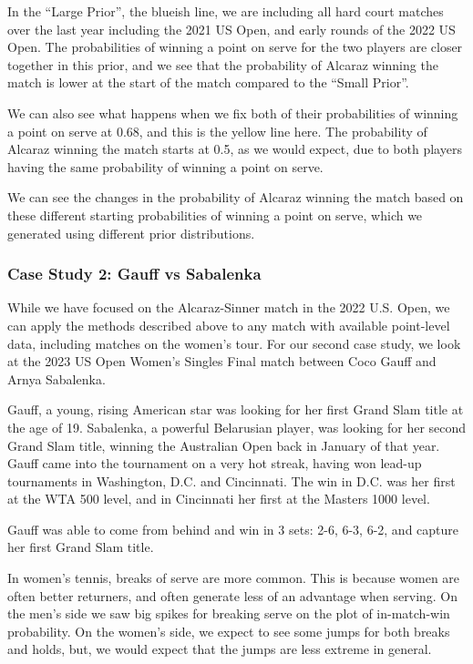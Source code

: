 \documentclass[
  letterpaper,
  DIV=11,
  numbers=noendperiod]{scrartcl}
\begin{document}
In the ``Large Prior'', the blueish line, we are including all hard
court matches over the last year including the 2021 US Open, and early
rounds of the 2022 US Open. The probabilities of winning a point on
serve for the two players are closer together in this prior, and we see
that the probability of Alcaraz winning the match is lower at the start
of the match compared to the ``Small Prior''.

We can also see what happens when we fix both of their probabilities of
winning a point on serve at 0.68, and this is the yellow line here. The
probability of Alcaraz winning the match starts at 0.5, as we would
expect, due to both players having the same probability of winning a
point on serve.

We can see the changes in the probability of Alcaraz winning the match
based on these different starting probabilities of winning a point on
serve, which we generated using different prior distributions.

\subsubsection{Case Study 2: Gauff vs Sabalenka}\label{sec-gauffsab}

While we have focused on the Alcaraz-Sinner match in the 2022 U.S. Open,
we can apply the methods described above to any match with available
point-level data, including matches on the women's tour. For our second
case study, we look at the 2023 US Open Women's Singles Final match
between Coco Gauff and Arnya Sabalenka.

Gauff, a young, rising American star was looking for her first Grand
Slam title at the age of 19. Sabalenka, a powerful Belarusian player,
was looking for her second Grand Slam title, winning the Australian Open
back in January of that year. Gauff came into the tournament on a very
hot streak, having won lead-up tournaments in Washington, D.C. and
Cincinnati. The win in D.C. was her first at the WTA 500 level, and in
Cincinnati her first at the Masters 1000 level.

Gauff was able to come from behind and win in 3 sets: 2-6, 6-3, 6-2, and
capture her first Grand Slam title.

In women's tennis, breaks of serve are more common. This is because
women are often better returners, and often generate less of an
advantage when serving. On the men's side we saw big spikes for breaking
serve on the plot of in-match-win probability. On the women's side, we
expect to see some jumps for both breaks and holds, but, we would expect
that the jumps are less extreme in general.
\end{document}
